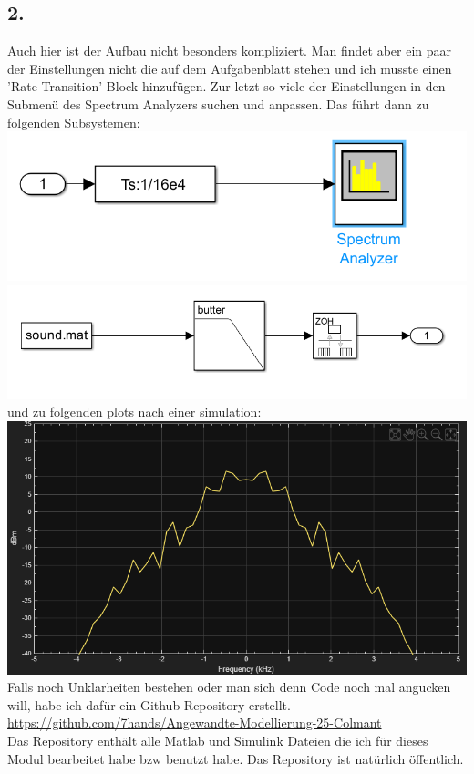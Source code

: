 \documentclass{scrartcl}
\begin{document}
\subsection*{2.}
Auch hier ist der Aufbau nicht besonders kompliziert. Man findet aber ein paar der Einstellungen nicht die auf dem Aufgabenblatt stehen und ich musste  einen 'Rate Transition' Block hinzufügen. Zur letzt so viele der Einstellungen in den Submenü des Spectrum Analyzers suchen und anpassen. Das führt dann zu folgenden Subsystemen:\\
\includegraphics[scale=0.6]{Spectrum_Viewer.png}\\
\includegraphics[scale=0.6]{Sound_Source.png} \\
und zu folgenden plots nach einer simulation:\\
\includegraphics[scale=0.6]{Spectrumsim.png}\\

Falls noch Unklarheiten bestehen oder man sich denn Code noch mal angucken will, habe ich dafür ein Github Repository erstellt.\\
\url{https://github.com/7hands/Angewandte-Modellierung-25-Colmant}\\
Das Repository enthält alle Matlab und Simulink Dateien die ich für dieses Modul bearbeitet habe bzw benutzt habe. Das Repository ist natürlich öffentlich.
\end{document}
